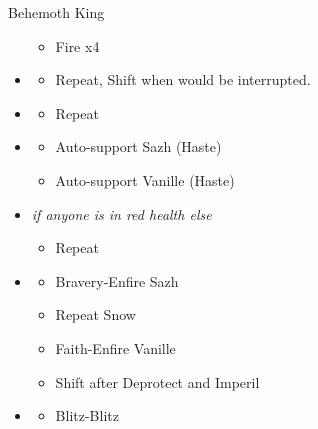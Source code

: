 \begin{paracol}{2}
\begin{battle}{Behemoth King}
\begin{itemize}
    \begin{itemize}
        \item Fire x4
    \end{itemize}
    \item \fifth
    \begin{itemize}
        \item Repeat, Shift when would be interrupted.
    \end{itemize}
    \item \sixth
    \begin{itemize}
        \item Repeat
    \end{itemize}
    \item \fourth
    \begin{itemize}
        \item Auto-support Sazh (Haste)
        \item Auto-support Vanille (Haste)
    \end{itemize}
    \item \fifth \textit{if anyone is in red health else} \sixth
    \begin{itemize}
        \item Repeat
    \end{itemize}
    \item \third
    \begin{itemize}
        \item Bravery-Enfire Sazh
        \item Repeat Snow
        \item Faith-Enfire Vanille
        \item Shift after Deprotect and Imperil
    \end{itemize}
    \item \second
    \begin{itemize}
        \item Blitz-Blitz
    \end{itemize}
\end{itemize}
\end{battle}
\switchcolumn*


\end{paracol}
